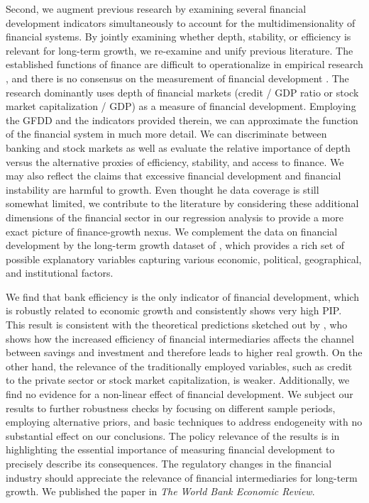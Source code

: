 \begin{refsection}
Second, we augment previous research by examining several financial development indicators simultaneously to account for the multidimensionality of financial systems. By jointly examining whether depth, stability, or efficiency is relevant for long-term growth, we re-examine and unify previous literature. The established functions of finance are difficult to operationalize in empirical research \parencite{Valickovaetal2014}, and there is no consensus on the measurement of financial development \parencite{KingLevine1993a}. The research dominantly uses depth of financial markets (credit / GDP ratio or stock market capitalization / GDP) as a measure of financial development. Employing the \ac{GFDD} and the indicators provided therein, we can approximate the function of the financial system in much more detail. We can discriminate between banking and stock markets as well as evaluate the relative importance of depth versus the alternative proxies of efficiency, stability, and access to finance. We may also reflect the claims that excessive financial development and financial instability are harmful to growth. Even thought he data coverage is still somewhat limited, we contribute to the literature by considering these additional dimensions of the financial sector in our regression analysis to provide a more exact picture of finance-growth nexus. We complement the data on financial development by the long-term growth dataset of \textcite{Fernandezetal2001}, which provides a rich set of possible explanatory variables capturing various economic, political, geographical, and institutional factors.

We find that bank efficiency is the only indicator of financial development, which is robustly related to economic growth and consistently shows very high \ac{PIP}. This result is consistent with the theoretical predictions sketched out by \textcite{Pagano1993}, who shows how the increased efficiency of financial intermediaries affects the channel between savings and investment and therefore leads to higher real growth. On the other hand, the relevance of the traditionally employed variables, such as credit to the private sector or stock market capitalization, is weaker. Additionally, we find no evidence for a non-linear effect of financial development. We subject our results to further robustness checks by focusing on different sample periods, employing alternative priors, and basic techniques to address endogeneity with no substantial effect on our conclusions. The policy relevance of the results is in highlighting the essential importance of measuring financial development to precisely describe its consequences. The regulatory changes in the financial industry should appreciate the relevance of financial intermediaries for long-term growth. We published the paper in \emph{The World Bank Economic Review}.


\end{refsection}
